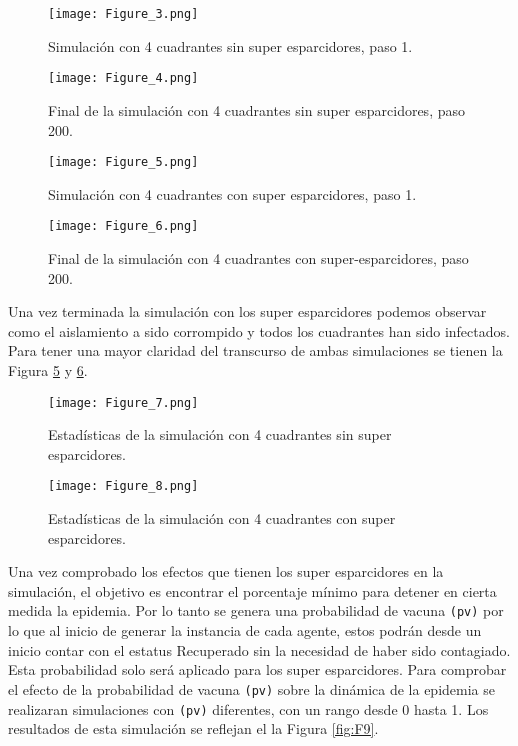 \documentclass[final,6p,times,twocolumn]{elsarticle}
\begin{document}
\begin{figure}
\label{fig:F3}
\centering
\texttt{[image: Figure\_3.png]}
\caption{Simulación con 4 cuadrantes sin super esparcidores, paso 1.}
\end{figure}



\begin{figure}
\label{fig:F4}
\centering
\texttt{[image: Figure\_4.png]}
\caption{Final de la simulación con 4 cuadrantes sin super esparcidores, paso 200.}
\end{figure}


\begin{figure}
\label{fig:F5}
\centering
\texttt{[image: Figure\_5.png]}
\caption{Simulación con 4 cuadrantes con super esparcidores, paso 1.}
\end{figure}

\begin{figure}
\label{fig:F6}
\centering
\texttt{[image: Figure\_6.png]}
\caption{Final de la simulación con 4 cuadrantes con super-esparcidores, paso 200.}
\end{figure}



Una vez terminada la simulación con los super esparcidores podemos observar como el aislamiento a sido corrompido y todos los cuadrantes han sido infectados. Para tener una mayor claridad del transcurso de ambas simulaciones se tienen la Figura \ref{fig:F7} y \ref{fig:F8}.

\begin{figure}
\label{fig:F7}
\centering
\texttt{[image: Figure\_7.png]}
\caption{Estadísticas de la simulación con 4 cuadrantes sin super esparcidores.}
\end{figure}

\begin{figure}
\label{fig:F8}
\centering
\texttt{[image: Figure\_8.png]}
\caption{Estadísticas de la simulación con 4 cuadrantes con super esparcidores.}
\end{figure}

Una vez comprobado los efectos que tienen los super esparcidores en la simulación, el objetivo es encontrar el porcentaje mínimo para detener en cierta medida la epidemia. Por lo tanto se genera una probabilidad de vacuna \texttt{(pv)} por lo que al inicio de generar la instancia de cada agente, estos podrán desde un inicio contar con el estatus Recuperado sin la necesidad de haber sido contagiado. Esta probabilidad solo será aplicado para los super esparcidores. Para comprobar el efecto de la probabilidad de vacuna \texttt{(pv)} sobre la dinámica de la epidemia se realizaran simulaciones con \texttt{(pv)} diferentes, con un rango desde 0 hasta 1. Los resultados de esta simulación se reflejan el la Figura \ref{fig:F9}.
\end{document}

